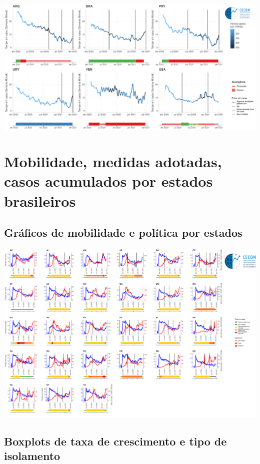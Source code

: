 \documentclass{SelfArx}
\begin{document}
\begin{center}
\includegraphics[width=.9\linewidth]{./figs/COVID/Mobilidade_Policy_selected_C6.pdf}
\end{center}




\section*{Mobilidade, medidas adotadas, casos acumulados por estados brasileiros}
\label{sec:org91bd8c8}

\subsection*{Gráficos de mobilidade e política por estados}
\label{sec:org988862e}

\begin{center}
\includegraphics[width=.9\linewidth]{./figs/COVID/Estados/Mobilidade_Policy_selected_C6.pdf}
\end{center}

\subsection*{Boxplots de taxa de crescimento e tipo de isolamento}
\label{sec:org196f728}
\end{document}
